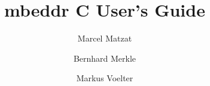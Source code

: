 \documentclass{llncs}
\title{mbeddr C User's Guide}
\author{Marcel Matzat\inst{1} \and Bernhard Merkle\inst{2} \and Markus
Voelter\inst{3}}
\institute{itemis AG \and Sick AG \and independent/itemis}
\begin{document}
\maketitle


\begin{abstract}
 
\end{abstract} 




 
%
\end{document}
